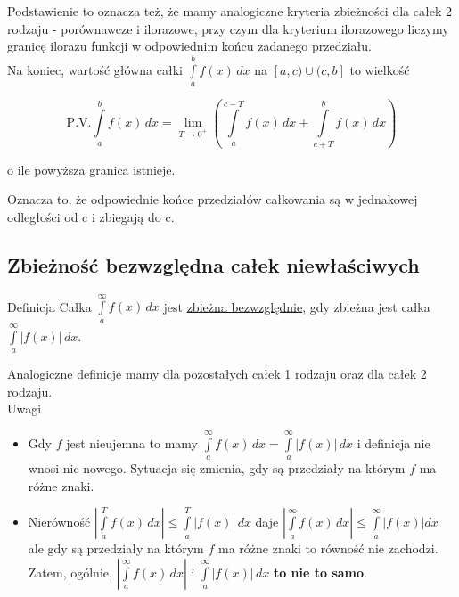 Podstawienie to oznacza też, że mamy analogiczne kryteria zbieżności dla całek 2 rodzaju - porównawcze i ilorazowe, przy
czym dla kryterium ilorazowego liczymy granicę ilorazu funkcji w odpowiednim końcu zadanego przedziału. \\

Na koniec, wartość główna całki $ \int\limits_{a}^{b} f(x) \,dx $ na $[a,c)\cup(c,b]$ to wielkość

$$ \textrm{P.V.} \int\limits_{a}^{b} f(x) \,dx = \lim_{T \to 0^+} 
\left( \int\limits_{a}^{c - T} f(x) \,dx + \int\limits_{c + T}^{b} f(x) \,dx \right) $$

o ile powyższa granica istnieje.

Oznacza to, że odpowiednie końce przedziałów całkowania są w jednakowej odległości od c i zbiegają do c.

\subsection*{Zbieżność bezwzględna całek niewłaściwych}

\begin{tw}{Definicja}
Całka $ \int\limits_{a}^{\infty} f(x) \,dx $ jest \underline{zbieżna bezwzględnie}, gdy zbieżna jest całka
$ \int\limits_{a}^{\infty} |f(x)| \,dx $.
\end{tw}

Analogiczne definicje mamy dla pozostałych całek 1 rodzaju oraz dla całek 2 rodzaju. \\

Uwagi

\begin{itemize}
    \item Gdy $f$ jest nieujemna to mamy $ \int\limits_{a}^{\infty} f(x) \,dx = \int\limits_{a}^{\infty} |f(x)| \,dx $
    i definicja nie wnosi nic nowego. Sytuacja się zmienia, gdy są przedziały na którym $f$ ma różne znaki.
    
    \item Nierówność $ \left| \int\limits_{a}^{T} f(x) \,dx \right| \leq \int\limits_{a}^{T} |f(x)| \,dx $ daje
    $ \left| \int\limits_{a}^{\infty} f(x) \,dx \right| \leq \int\limits_{a}^{\infty} |f(x)| dx $ ale gdy są przedziały
    na którym $f$ ma różne znaki to równość nie zachodzi.
    Zatem, ogólnie, $ \left| \int\limits_{a}^{\infty} f(x) \,dx \right| $ i $ \int\limits_{a}^{\infty} |f(x)| \,dx $
    \textbf{to nie to samo}. \\
\end{itemize}

